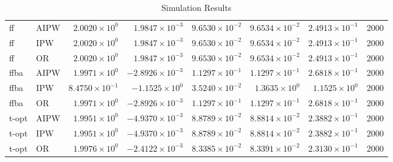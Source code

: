 \begin{table}[ht]
\begin{tabular}{llrrrrrr}
   \midrule
ff & AIPW & $2.0020 \times 10^{0}$ & $1.9847 \times 10^{-3}$ & $9.6530 \times 10^{-2}$ & $9.6534 \times 10^{-2}$ & $2.4913 \times 10^{-1}$ & 2000 \\ 
  ff & IPW & $2.0020 \times 10^{0}$ & $1.9847 \times 10^{-3}$ & $9.6530 \times 10^{-2}$ & $9.6534 \times 10^{-2}$ & $2.4913 \times 10^{-1}$ & 2000 \\ 
  ff & OR & $2.0020 \times 10^{0}$ & $1.9847 \times 10^{-3}$ & $9.6530 \times 10^{-2}$ & $9.6534 \times 10^{-2}$ & $2.4913 \times 10^{-1}$ & 2000 \\ 
   \midrule
ffba & AIPW & $1.9971 \times 10^{0}$ & $-2.8926 \times 10^{-3}$ & $1.1297 \times 10^{-1}$ & $1.1297 \times 10^{-1}$ & $2.6818 \times 10^{-1}$ & 2000 \\ 
  ffba & IPW & $8.4750 \times 10^{-1}$ & $-1.1525 \times 10^{0}$ & $3.5240 \times 10^{-2}$ & $1.3635 \times 10^{0}$ & $1.1525 \times 10^{0}$ & 2000 \\ 
  ffba & OR & $1.9971 \times 10^{0}$ & $-2.8926 \times 10^{-3}$ & $1.1297 \times 10^{-1}$ & $1.1297 \times 10^{-1}$ & $2.6818 \times 10^{-1}$ & 2000 \\ 
   \midrule
t-opt & AIPW & $1.9951 \times 10^{0}$ & $-4.9370 \times 10^{-3}$ & $8.8789 \times 10^{-2}$ & $8.8814 \times 10^{-2}$ & $2.3882 \times 10^{-1}$ & 2000 \\ 
  t-opt & IPW & $1.9951 \times 10^{0}$ & $-4.9370 \times 10^{-3}$ & $8.8789 \times 10^{-2}$ & $8.8814 \times 10^{-2}$ & $2.3882 \times 10^{-1}$ & 2000 \\ 
  t-opt & OR & $1.9976 \times 10^{0}$ & $-2.4122 \times 10^{-3}$ & $8.3385 \times 10^{-2}$ & $8.3391 \times 10^{-2}$ & $2.3130 \times 10^{-1}$ & 2000 \\ 
   \bottomrule
\end{tabular}
\caption{Simulation Results} 
\label{tab:results}
\end{table}

